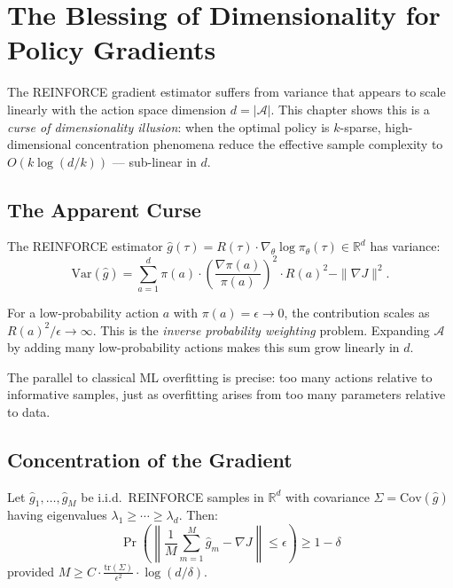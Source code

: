 \chapter{The Blessing of Dimensionality for Policy Gradients}\label{ch:blessing}

The REINFORCE gradient estimator suffers from variance that appears to scale linearly with the action space dimension $d = |\mathcal{A}|$. This chapter shows this is a \emph{curse of dimensionality illusion}: when the optimal policy is $k$-sparse, high-dimensional concentration phenomena reduce the effective sample complexity to $O(k \log(d/k))$ --- sub-linear in $d$.


\section{The Apparent Curse}

The REINFORCE estimator $\hat{g}(\tau) = R(\tau) \cdot \nabla_\theta \log \pi_\theta(\tau) \in \mathbb{R}^d$ has variance:
\begin{equation}\label{eq:reinforce-var}
    \text{Var}(\hat{g}) = \sum_{a=1}^d \pi(a) \cdot \left(\frac{\nabla \pi(a)}{\pi(a)}\right)^2 \cdot R(a)^2 - \|\nabla J\|^2.
\end{equation}

For a low-probability action $a$ with $\pi(a) = \epsilon \to 0$, the contribution scales as $R(a)^2/\epsilon \to \infty$. This is the \emph{inverse probability weighting} problem. Expanding $\mathcal{A}$ by adding many low-probability actions makes this sum grow linearly in $d$.

The parallel to classical ML overfitting is precise: too many actions relative to informative samples, just as overfitting arises from too many parameters relative to data.


\section{Concentration of the Gradient}

\begin{theorem}\label{thm:grad-concentration}
Let $\hat{g}_1, \ldots, \hat{g}_M$ be i.i.d.\ REINFORCE samples in $\mathbb{R}^d$ with covariance $\Sigma = \text{Cov}(\hat{g})$ having eigenvalues $\lambda_1 \geq \cdots \geq \lambda_d$. Then:
\begin{equation}
    \Pr\!\left(\left\|\frac{1}{M}\sum_{m=1}^M \hat{g}_m - \nabla J\right\| \leq \epsilon\right) \geq 1 - \delta
\end{equation}
provided $M \geq C \cdot \frac{\text{tr}(\Sigma)}{\epsilon^2} \cdot \log(d/\delta)$.
\end{theorem}

